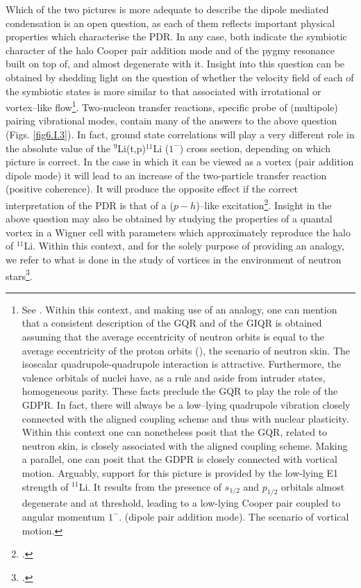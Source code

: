 \begin{subappendices}
Which of the two  pictures is more adequate to describe  the dipole mediated condensation is an open question,  
as each of them reflects  important physical properties which   characterise  the PDR. In any case, both indicate the symbiotic character  of the halo Cooper pair  addition mode  and of the pygmy resonance  built on top of, and almost degenerate with it. 
Insight into this question can be obtained  by shedding light on the question  of whether  the velocity field of each of the symbiotic  states is more similar  to that associated  with irrotational or vortex--like flow\footnote{See \cite{Repko:13}. Within this context, and making use of an analogy, one can  mention that a consistent description of the GQR and of the GIQR is obtained 
assuming that the average eccentricity of neutron orbits 
is equal to the average eccentricity of the proton orbits (\cite{Bes:75c}), the scenario of neutron skin.
The  isoscalar quadrupole-quadrupole interaction is attractive. Furthermore, 
the valence orbitals of nuclei have, as a rule and aside from intruder states, homogeneous parity. These facts  preclude 
the GQR to play the role of the GDPR. In fact, there will always be a low--lying quadrupole vibration closely 
connected with the aligned coupling scheme and thus  with nuclear plasticity. Within this context one can  nonetheless  posit  that the GQR, related to neutron skin,  is closely associated with the aligned coupling scheme.
Making a parallel, one can posit  that the GDPR is closely connected with vortical motion. 
Arguably,  support for this picture is provided by the   low-lying  E1 
strength of $^{11}$Li. It  results from the presence of $s_{1/2}$ and $p_{1/2}$ orbitals almost degenerate and at threshold, 
leading to a low-lying Cooper pair coupled to angular momentum $1^-$. (dipole pair addition mode). 
The  scenario of vortical motion. }. Two-nucleon transfer reactions, specific probe  of (multipole) pairing vibrational modes, contain many of the answers to the above question (Figs. \ref{fig6.I.3}). 
In fact,  ground state correlations will play a very different role in the absolute value of the $^9$Li(t,p)$^{11}$Li ($1^-$) cross section,
depending  on which picture is correct. In the case in which 
it can be 
 viewed as a vortex (pair addition dipole mode) it will lead to an increase of the two-particle transfer reaction 
 (positive coherence).
 It will  produce the opposite effect if the correct interpretation of the PDR   is that of a 
($p-h$)--like excitation\footnote{ \cite{Broglia:71}.}. 
Insight  in the above question may also be obtained by studying  the properties of
a quantal vortex in a Wigner cell with parameters which approximately reproduce 
the halo of $^{11}$Li. Within this context, and  for the solely purpose of providing an analogy, we refer 
to what is done in the study of vortices in the environment of neutron stars\footnote{\cite{Avogadro:07,Avogadro:08}.}.



\end{subappendices}
